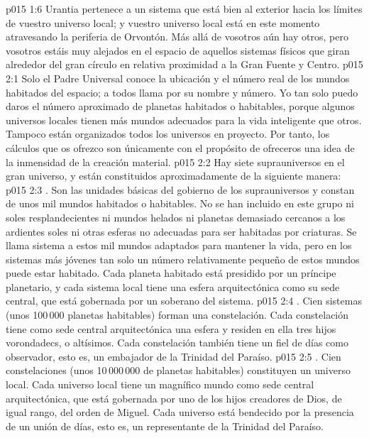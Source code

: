 \vs p015 1:6 Urantia pertenece a un sistema que está bien al exterior hacia los límites de vuestro universo local; y vuestro universo local está en este momento atravesando la periferia de Orvontón. Más allá de vosotros aún hay otros, pero vosotros estáis muy alejados en el espacio de aquellos sistemas físicos que giran alrededor del gran círculo en relativa proximidad a la Gran Fuente y Centro.
\vs p015 2:1 Solo el Padre Universal conoce la ubicación y el número real de los mundos habitados del espacio; a todos llama por su nombre y número. Yo tan solo puedo daros el número aproximado de planetas habitados o habitables, porque algunos universos locales tienen más mundos adecuados para la vida inteligente que otros. Tampoco están organizados todos los universos en proyecto. Por tanto, los cálculos que os ofrezco son únicamente con el propósito de ofreceros una idea de la inmensidad de la creación material.
\vs p015 2:2 \pc Hay siete suprauniversos en el gran universo, y están constituidos aproximadamente de la siguiente manera:
\vs p015 2:3 . Son las unidades básicas del gobierno de los suprauniversos y constan de unos mil mundos habitados o habitables. No se han incluido en este grupo ni soles resplandecientes ni mundos helados ni planetas demasiado cercanos a los ardientes soles ni otras esferas no adecuadas para ser habitadas por criaturas. Se llama sistema a estos mil mundos adaptados para mantener la vida, pero en los sistemas más jóvenes tan solo un número relativamente pequeño de estos mundos puede estar habitado. Cada planeta habitado está presidido por un príncipe planetario, y cada sistema local tiene una esfera arquitectónica como su sede central, que está gobernada por un soberano del sistema.
\vs p015 2:4 . Cien sistemas (unos 100\,000 planetas habitables) forman una constelación. Cada constelación tiene como sede central arquitectónica una esfera y residen en ella tres hijos vorondadecs, o altísimos. Cada constelación también tiene un fiel de días como observador, esto es, un embajador de la Trinidad del Paraíso.
\vs p015 2:5 . Cien constelaciones (unos 10\,000\,000 de planetas habitables) constituyen un universo local. Cada universo local tiene un magnífico mundo como sede central arquitectónica, que está gobernada por uno de los hijos creadores de Dios, de igual rango, del orden de Miguel. Cada universo está bendecido por la presencia de un unión de días, esto es, un representante de la Trinidad del Paraíso.
